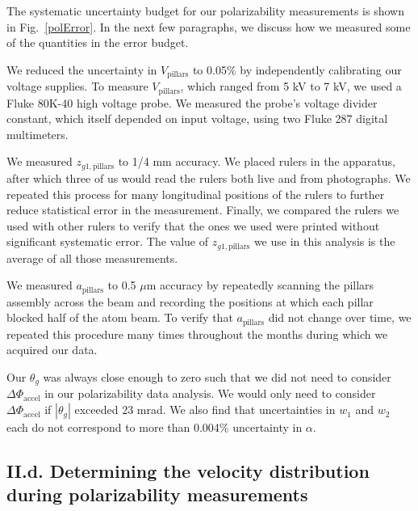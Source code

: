 \documentclass[twocolumn,pra,showpacs,superscriptaddress,longbibliography]{revtex4-1}   %
\newcommand{\figref}[1]{Fig.~\ref{#1}}
\newcommand{\dphiaccel}{\Delta\Phi_{\mathrm{accel}}}
\begin{document}
The systematic uncertainty budget for our polarizability measurements is shown in \figref{polError}. In the next few paragraphs, we discuss how we measured some of the quantities in the error budget.

We reduced the uncertainty in $V_{\mathrm{pillars}}$ to 0.05\% by independently calibrating our voltage supplies. To measure $V_{\mathrm{pillars}}$, which ranged from 5 kV to 7 kV, we used a Fluke 80K-40 high voltage probe. We measured the probe's voltage divider constant, which itself depended on input voltage, using two Fluke 287 digital multimeters.

We measured $z_{g1,\mathrm{pillars}}$ to 1/4 mm accuracy. We placed rulers in the apparatus, after which three of us  would read the rulers both live and from photographs. We repeated this process for many longitudinal positions of the rulers to further reduce statistical error in the measurement. Finally, we compared the rulers we used with other rulers to verify that the ones we used were printed without significant systematic error. The value of $z_{g1,\mathrm{pillars}}$ we use in this analysis is the average of all those measurements. 

We measured $a_{\mathrm{pillars}}$ to 0.5 $\mu$m accuracy by repeatedly scanning the pillars assembly across the beam and recording the positions at which each pillar blocked half of the atom beam. 
To verify that $a_{\mathrm{pillars}}$ did not change over time, we repeated this procedure many times throughout the months during which we acquired our data.


Our $\theta_g$ was always close enough to zero such that we did not need to consider $\dphiaccel$ in our polarizability data analysis. We would only need to consider $\dphiaccel$ if $|\theta_g|$ exceeded 23 mrad.
We also find that uncertainties in $w_1$ and $w_2$ each do not correspond to more than 0.004\% uncertainty in $\alpha$.

\subsection{II.d. Determining the velocity distribution during polarizability measurements}
\end{document}
